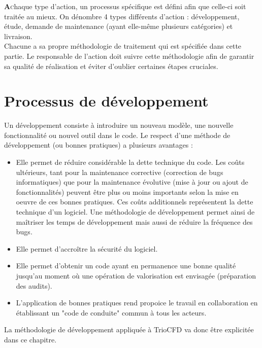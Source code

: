 
\lettrine[lines=2,slope=0pt,nindent=4pt]{\textbf{A}} chaque type d'action, un processus spécifique est défini afin que celle-ci soit traitée au mieux. On dénombre 4 types différents d'action : développement, étude, demande de maintenance (ayant elle-même plusieurs catégories) et livraison. \\
Chacune a sa propre méthodologie de traitement qui est spécifiée dans cette partie. Le responsable de l'action doit suivre cette méthodologie afin de garantir sa qualité de réalisation et éviter d'oublier certaines étapes cruciales.

\chapter{\label{chapter:dev}Processus de d\'eveloppement}
Un développement consiste à introduire un nouveau modèle, une nouvelle fonctionnalité ou nouvel outil dans le code. Le respect d'une méthode de développement (ou bonnes pratiques) a plusieurs avantages :
\begin{itemize}[label=$\Rightarrow$, font=\LARGE]
   \item Elle permet de réduire considérable la dette technique du code. Les coûts ultérieurs, tant pour la maintenance corrective (correction de bugs informatiques) que pour la maintenance évolutive (mise à jour ou ajout de fonctionnalités) peuvent être plus ou moins importants selon la mise en oeuvre de ces bonnes pratiques. Ces coûts additionnels représentent la dette technique d'un logiciel. Une méthodologie de développement permet ainsi de maîtriser les temps de développement mais aussi de réduire la fréquence des bugs.
   \item Elle permet d'accroître la sécurité du logiciel.
   \item Elle permet d'obtenir un code ayant en permanence une bonne qualité jusqu'au moment où une opération de valorisation est envisagée (préparation des audits).
   \item L'application de bonnes pratiques rend propoice le travail en collaboration en établissant un "code de conduite" commun à tous les acteurs.
\end{itemize}

La méthodologie de développement appliquée à TrioCFD va donc être explicitée dans ce chapitre.

